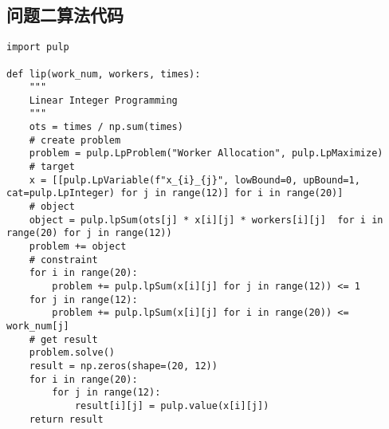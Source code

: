 \subsection{问题二算法代码}
\begin{lstlisting}[caption={线性整数规划}, label={lst:python}]
import pulp

def lip(work_num, workers, times):
    """
    Linear Integer Programming
    """
    ots = times / np.sum(times)
    # create problem
    problem = pulp.LpProblem("Worker Allocation", pulp.LpMaximize)
    # target
    x = [[pulp.LpVariable(f"x_{i}_{j}", lowBound=0, upBound=1, cat=pulp.LpInteger) for j in range(12)] for i in range(20)]
    # object
    object = pulp.lpSum(ots[j] * x[i][j] * workers[i][j]  for i in range(20) for j in range(12))
    problem += object
    # constraint
    for i in range(20):
        problem += pulp.lpSum(x[i][j] for j in range(12)) <= 1
    for j in range(12):
        problem += pulp.lpSum(x[i][j] for i in range(20)) <=  work_num[j] 
    # get result
    problem.solve()
    result = np.zeros(shape=(20, 12))
    for i in range(20):
        for j in range(12):
            result[i][j] = pulp.value(x[i][j]) 
    return result 
\end{lstlisting}

